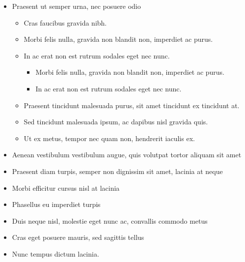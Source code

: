 \documentclass[12pt,a4paper]{article}
\begin{document}
\begin{itemize}
    \item Praesent ut semper urna, nec posuere odio
        \begin{itemize}
            \item  Cras faucibus gravida nibh.
            \item  Morbi felis nulla, gravida non blandit non, imperdiet ac purus.
            \item  In ac erat non est rutrum sodales eget nec nunc.
                \begin{itemize}
                    \item  Morbi felis nulla, gravida non blandit non, imperdiet ac purus.
                    \item  In ac erat non est rutrum sodales eget nec nunc.
                \end{itemize}
            \item  Praesent tincidunt malesuada purus, sit amet tincidunt ex tincidunt at.
            \item  Sed tincidunt malesuada ipsum, ac dapibus nisl gravida quis.
            \item  Ut ex metus, tempor nec quam non, hendrerit iaculis ex.
        \end{itemize}
    \item Aenean vestibulum vestibulum augue, quis volutpat tortor aliquam sit amet
    \item Praesent diam turpis, semper non dignissim sit amet, lacinia at neque
    \item Morbi efficitur cursus nisl at lacinia
    \item Phasellus eu imperdiet turpis
    \item Duis neque nisl, molestie eget nunc ac, convallis commodo metus
    \item Cras eget posuere mauris, sed sagittis tellus
    \item Nunc tempus dictum lacinia. 
\end{itemize}
\end{document}
